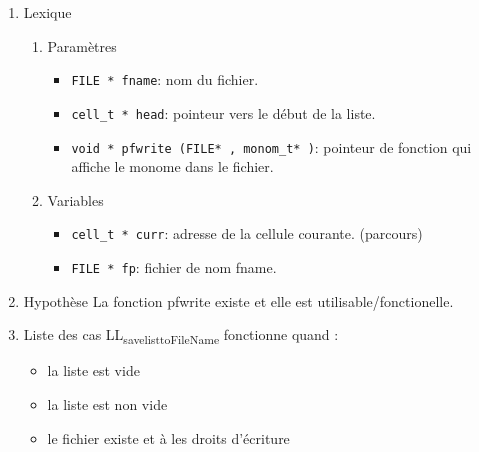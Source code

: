 \documentclass[11pt]{article}
\begin{document}
\begin{enumerate}
\item Lexique
\label{sec:org8714579}
\begin{enumerate}
\item Paramètres
\label{sec:org5d44c82}
\begin{itemize}
\item \texttt{FILE * fname}: nom du fichier.
\item \texttt{cell\_t * head}: pointeur vers le début de la liste.
\item \texttt{void * pfwrite (FILE* , monom\_t* )}: pointeur de fonction qui affiche le monome dans le fichier.
\end{itemize}
\item Variables
\label{sec:org3b9370a}
\begin{itemize}
\item \texttt{cell\_t * curr}: adresse de la cellule courante. (parcours)
\item \texttt{FILE * fp}: fichier de nom fname.
\end{itemize}
\end{enumerate}

\item Hypothèse
\label{sec:orgee7dd0a}
La fonction pfwrite existe et elle est utilisable/fonctionelle.
\item Liste des cas
\label{sec:org6f40ab2}
LL\textsubscript{save}\textsubscript{list}\textsubscript{toFileName} fonctionne quand :
\begin{itemize}
\item la liste est vide
\item la liste est non vide
\item le fichier existe et à les droits d'écriture
\end{itemize}
\end{enumerate}
\end{document}

